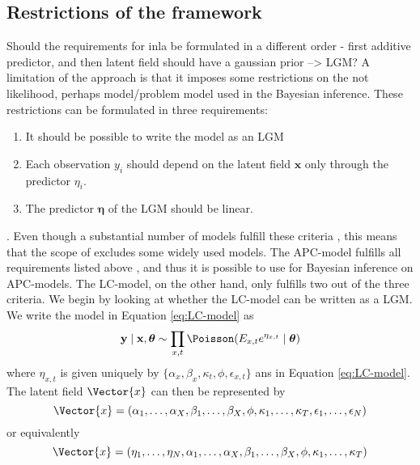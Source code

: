 \subsection{Restrictions of the \inla framework}
\textcolor{myDarkGreen}{Should the requirements for inla be formulated in a different order - first additive predictor, and then latent field should have a gaussian prior --> LGM? }
A limitation of the \inla approach is that it imposes some restrictions on the \textcolor{myDarkGreen}{not likelihood, perhaps model/problem} model used in the Bayesian inference. These restrictions can be formulated in three requirements:
\begin{enumerate}
    \item It should be possible to write the model as an LGM
    \item Each observation $y_i$ should depend on the latent field $\textbf{x}$ only through the predictor $\eta_i$. 
    \item The predictor $\boldsymbol{\eta}$ of the LGM should be linear.
    \label{item:inlaRequirements}
\end{enumerate}
\cite{martinoRiebler2019}.
Even though a substantial number of models fulfill these criteria \cite{rue2009inla}, this means that the scope of \inla excludes some widely used models. 
\newline
\noindent The APC-model fulfills all requirements listed above \cite{rieblerHeld2010}, and thus it is possible to use \inla for Bayesian inference on APC-models. The LC-model, on the other hand, only fulfills two out of the three criteria. We begin by looking at whether the LC-model can be written as a LGM. We write the model in Equation \ref{eq:LC-model} as 
\begin{equation}
    \textbf{y}\mid \textbf{x}, \boldsymbol{\theta} \sim \prod_{x,t}\Poisson(E_{x,t}e^{\eta_{x,t}}\mid \boldsymbol{\theta})
\end{equation}
where $\eta_{x,t}$ is given uniquely by $\{\alpha_x, \beta_x, \kappa_t, \phi, \epsilon_{x,t}\}$ ans in Equation \ref{eq:LC-model}. The latent field $\Vector{x}$ can then be represented by 
\begin{equation*}
    \Vector{x} = (\alpha_1,\ldots,\alpha_X,\beta_1,\ldots,\beta_X, \phi, \kappa_1,\ldots, \kappa_T, \epsilon_1, \ldots, \epsilon_N)
\end{equation*}
or equivalently 
\begin{equation}
    \Vector{x} = (\eta_1,\ldots,\eta_N,\alpha_1,\ldots,\alpha_X,\beta_1,\ldots,\beta_X, \phi, \kappa_1,\ldots, \kappa_T)
    \label{eq:LChyperparams}
\end{equation}
